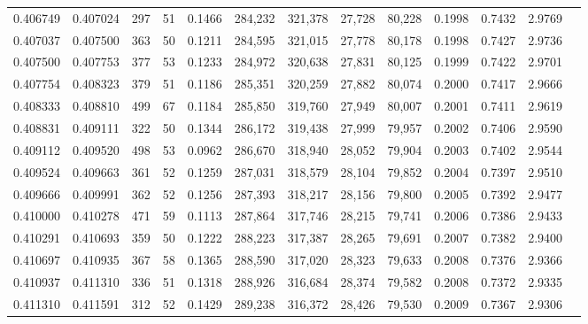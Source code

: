 \begin{tabular}{rrrrrrrrrrrrr}
0.406749 & 0.407024 &    297 &    51 &                                     0.1466 & 284,232 & 321,378 &  27,728 &  80,228 & 0.1998 & 0.7432 & 2.9769 \\
0.407037 & 0.407500 &    363 &    50 &                                     0.1211 & 284,595 & 321,015 &  27,778 &  80,178 & 0.1998 & 0.7427 & 2.9736 \\
0.407500 & 0.407753 &    377 &    53 &                                     0.1233 & 284,972 & 320,638 &  27,831 &  80,125 & 0.1999 & 0.7422 & 2.9701 \\
0.407754 & 0.408323 &    379 &    51 &                                     0.1186 & 285,351 & 320,259 &  27,882 &  80,074 & 0.2000 & 0.7417 & 2.9666 \\
0.408333 & 0.408810 &    499 &    67 &                                     0.1184 & 285,850 & 319,760 &  27,949 &  80,007 & 0.2001 & 0.7411 & 2.9619 \\
0.408831 & 0.409111 &    322 &    50 &                                     0.1344 & 286,172 & 319,438 &  27,999 &  79,957 & 0.2002 & 0.7406 & 2.9590 \\
0.409112 & 0.409520 &    498 &    53 &                                     0.0962 & 286,670 & 318,940 &  28,052 &  79,904 & 0.2003 & 0.7402 & 2.9544 \\
0.409524 & 0.409663 &    361 &    52 &                                     0.1259 & 287,031 & 318,579 &  28,104 &  79,852 & 0.2004 & 0.7397 & 2.9510 \\
0.409666 & 0.409991 &    362 &    52 &                                     0.1256 & 287,393 & 318,217 &  28,156 &  79,800 & 0.2005 & 0.7392 & 2.9477 \\
0.410000 & 0.410278 &    471 &    59 &                                     0.1113 & 287,864 & 317,746 &  28,215 &  79,741 & 0.2006 & 0.7386 & 2.9433 \\
0.410291 & 0.410693 &    359 &    50 &                                     0.1222 & 288,223 & 317,387 &  28,265 &  79,691 & 0.2007 & 0.7382 & 2.9400 \\
0.410697 & 0.410935 &    367 &    58 &                                     0.1365 & 288,590 & 317,020 &  28,323 &  79,633 & 0.2008 & 0.7376 & 2.9366 \\
0.410937 & 0.411310 &    336 &    51 &                                     0.1318 & 288,926 & 316,684 &  28,374 &  79,582 & 0.2008 & 0.7372 & 2.9335 \\
0.411310 & 0.411591 &    312 &    52 &                                     0.1429 & 289,238 & 316,372 &  28,426 &  79,530 & 0.2009 & 0.7367 & 2.9306 \\

\end{tabular}
